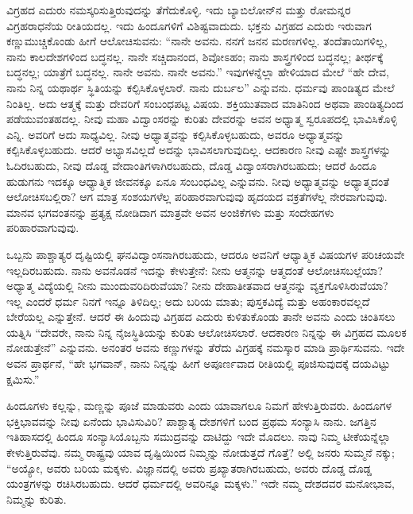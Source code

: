 ವಿಗ್ರಹದ ಎದುರು ನಮಸ್ಕರಿಸುತ್ತಿರುವುದನ್ನು ತೆಗೆದುಕೊಳ್ಳಿ. ಇದು ಬ್ಯಾಬಿಲೋನ್​ನ ಮತ್ತು ರೋಮನ್ನರ ವಿಗ್ರಹರಾಧನೆಯ ರೀತಿಯದಲ್ಲ. ಇದು ಹಿಂದೂಗಳಿಗೆ ವಿಶಿಷ್ಟವಾದುದು. ಭಕ್ತನು ವಿಗ್ರಹದ ಎದುರು ಇರುವಾಗ ಕಣ್ಣುಮುಚ್ಚಿಕೊಂಡು ಹೀಗೆ ಆಲೋಚಿಸುವನು: “ನಾನೇ ಅವನು. ನನಗೆ ಜನನ ಮರಣಗಳಿಲ್ಲ. ತಂದೆತಾಯಿಗಳಿಲ್ಲ, ನಾನು ಕಾಲದೇಶಗಳಿಂದ ಬದ್ಧನಲ್ಲ. ನಾನೇ ಸಚ್ಚಿದಾನಂದ, ಶಿವೋಽಹಂ; ನಾನು ಶಾಸ್ತ್ರಗಳಿಂದ ಬದ್ಧನಲ್ಲ; ತೀರ್ಥಕ್ಕೆ ಬದ್ಧನಲ್ಲ; ಯಾತ್ರೆಗೆ ಬದ್ಧನಲ್ಲ. ನಾನೇ ಅವನು. ನಾನೇ ಅವನು.” ಇವುಗಳನ್ನೆಲ್ಲಾ ಹೇಳಿಯಾದ ಮೇಲೆ “ಹೇ ದೇವ, ನಾನು ನಿನ್ನ ಯಥಾರ್ಥ ಸ್ಥಿತಿಯನ್ನು ಕಲ್ಪಿಸಿಕೊಳ್ಳಲಾರೆ. ನಾನು ದುರ್ಬಲ” ಎನ್ನುವನು. ಧರ್ಮವು ಪಾಂಡಿತ್ಯದ ಮೇಲೆ ನಿಂತಿಲ್ಲ. ಅದು ಆತ್ಮಕ್ಕೆ ಮತ್ತು ದೇವರಿಗೆ ಸಂಬಂಧಪಟ್ಟ ವಿಷಯ. ಶಕ್ತಿಯುತವಾದ ಮಾತಿನಿಂದ ಅಥವಾ ಪಾಂಡಿತ್ಯದಿಂದ ಪಡೆಯುವಂತಹದಲ್ಲ. ನೀವು ಮಹಾ ವಿದ್ವಾಂಸರನ್ನು ಕುರಿತು ದೇವರನ್ನು ಅವನ ಅಧ್ಯಾತ್ಮ ಸ್ವರೂಪದಲ್ಲಿ ಭಾವಿಸಿಕೊಳ್ಳಿ ಎನ್ನಿ. ಅವರಿಗೆ ಅದು ಸಾಧ್ಯವಿಲ್ಲ. ನೀವು ಅಧ್ಯಾತ್ಮವನ್ನು ಕಲ್ಪಿಸಿಕೊಳ್ಳಬಹುದು, ಅವರೂ ಅಧ್ಯಾತ್ಮವನ್ನು ಕಲ್ಪಿಸಿಕೊಳ್ಳಬಹುದು. ಆದರೆ ಅಭ್ಯಾಸವಿಲ್ಲದೆ ಅದನ್ನು ಭಾವಿಸಲಾಗುವುದಿಲ್ಲ. ಆದಕಾರಣ ನೀವು ಎಷ್ಟೇ ಶಾಸ್ತ್ರಗಳನ್ನು ಓದಿರಬಹುದು, ನೀವು ದೊಡ್ಡ ವೇದಾಂತಿಗಳಾಗಿರಬಹುದು, ದೊಡ್ಡ ವಿದ್ವಾಂಸರಾಗಿರಬಹುದು; ಆದರೆ ಹಿಂದೂ ಹುಡುಗನು ಇದಕ್ಕೂ ಆಧ್ಯಾತ್ಮಿಕ ಜೀವನಕ್ಕೂ ಏನೂ ಸಂಬಂಧವಿಲ್ಲ ಎನ್ನುವನು. ನೀವು ಅಧ್ಯಾತ್ಮವನ್ನು ಅಧ್ಯಾತ್ಮದಂತೆ ಆಲೋಚಿಸಬಲ್ಲಿರಾ? ಆಗ ಮಾತ್ರ ಸಂಶಯಗಳೆಲ್ಲ ಪರಿಹಾರವಾಗುವುವು ಹೃದಯದ ವಕ್ರತೆಗಳೆಲ್ಲ ನೇರವಾಗುವುವು. ಮಾನವ ಭಗವಂತನನ್ನು ಪ್ರತ್ಯಕ್ಷ ನೋಡಿದಾಗ ಮಾತ್ರವೇ ಅವನ ಅಂಜಿಕೆಗಳು ಮತ್ತು ಸಂದೇಹಗಳು ಪರಿಹಾರವಾಗುವುವು.

ಒಬ್ಬನು ಪಾಶ್ಚಾತ್ಯರ ದೃಷ್ಟಿಯಲ್ಲಿ ಘನವಿದ್ವಾಂಸನಾಗಿರಬಹುದು, ಆದರೂ ಅವನಿಗೆ ಆಧ್ಯಾತ್ಮಿಕ ವಿಷಯಗಳ ಪರಿಚಯವೇ ಇಲ್ಲದಿರಬಹುದು. ನಾನು ಅವನೊಡನೆ ಇದನ್ನು ಕೇಳುತ್ತೇನೆ: ನೀನು ಆತ್ಮನನ್ನು ಆತ್ಮದಂತೆ ಆಲೋಚಿಸಬಲ್ಲೆಯಾ? ಅಧ್ಯಾತ್ಮ ವಿದ್ಯೆಯಲ್ಲಿ ನೀನು ಮುಂದುವರಿದಿರುವೆಯಾ? ನೀನು ದೇಹಾತೀತವಾದ ಆತ್ಮನನ್ನು ವ್ಯಕ್ತಗೊಳಿಸಿರುವೆಯಾ? ಇಲ್ಲ ಎಂದರೆ ಧರ್ಮ ನಿನಗೆ ಇನ್ನೂ ತಿಳಿದಿಲ್ಲ; ಅದು ಬರಿಯ ಮಾತು; ಪುಸ್ತಕವಿದ್ಯೆ ಮತ್ತು ಅಹಂಕಾರವಲ್ಲದೆ ಬೇರೆಯಲ್ಲ ಎನ್ನುತ್ತೇನೆ. ಆದರೆ ಈ ಹಿಂದುವು ವಿಗ್ರಹದ ಎದುರು ಕುಳಿತುಕೊಂಡು ತಾನೇ ಅವನು ಎಂದು ಚಿಂತಿಸಲು ಯತ್ನಿಸಿ “ದೇವರೇ, ನಾನು ನಿನ್ನ ನೈಜಸ್ಥಿತಿಯನ್ನು ಕುರಿತು ಆಲೋಚಿಸಲಾರೆ. ಆದಕಾರಣ ನಿನ್ನನ್ನು ಈ ವಿಗ್ರಹದ ಮೂಲಕ ನೋಡುತ್ತೇನೆ” ಎನ್ನುವನು. ಅನಂತರ ಅವನು ಕಣ್ಣುಗಳನ್ನು ತೆರೆದು ವಿಗ್ರಹಕ್ಕೆ ನಮಸ್ಕಾರ ಮಾಡಿ ಪ್ರಾರ್ಥಿಸುವನು. ಇದೇ ಅವನ ಪ್ರಾರ್ಥನೆ, “ಹೇ ಭಗವಾನ್​, ನಾನು ನಿನ್ನನ್ನು ಹೀಗೆ ಅಪೂರ್ಣವಾದ ರೀತಿಯಲ್ಲಿ ಪೂಜಿಸುವುದಕ್ಕೆ ದಯವಿಟ್ಟು ಕ್ಷಮಿಸು.”

ಹಿಂದೂಗಳು ಕಲ್ಲನ್ನು, ಮಣ್ಣನ್ನು ಪೂಜೆ ಮಾಡುವರು ಎಂದು ಯಾವಾಗಲೂ ನಿಮಗೆ ಹೇಳುತ್ತಿರುವರು. ಹಿಂದೂಗಳ ಭಕ್ತಿಭಾವವನ್ನು ನೀವು ಏನೆಂದು ಭಾವಿಸುವಿರಿ? ಪಾಶ್ಚಾತ್ಯ ದೇಶಗಳಿಗೆ ಬಂದ ಪ್ರಥಮ ಸಂನ್ಯಾಸಿ ನಾನು. ಜಗತ್ತಿನ ಇತಿಹಾಸದಲ್ಲಿ ಹಿಂದೂ ಸಂನ್ಯಾಸಿಯೊಬ್ಬನು ಸಮುದ್ರವನ್ನು ದಾಟಿದ್ದು ಇದೇ ಮೊದಲು. ನಾವು ನಿಮ್ಮ ಟೀಕೆಯನ್ನೆಲ್ಲಾ ಕೇಳುತ್ತಿರುವೆವು. ನಮ್ಮ ರಾಷ್ಟ್ರವು ಯಾವ ದೃಷ್ಟಿಯಿಂದ ನಿಮ್ಮನ್ನು ನೋಡುತ್ತದೆ ಗೊತ್ತೆ? ಅಲ್ಲಿ ಜನರು ಸುಮ್ಮನೆ ನಕ್ಕು; “ಅಯ್ಯೋ, ಅವರು ಬರಿಯ ಮಕ್ಕಳು. ವಿಜ್ಞಾನದಲ್ಲಿ ಅವರು ಪ್ರಖ್ಯಾತರಾಗಿರಬಹುದು, ಅವರು ದೊಡ್ಡ ದೊಡ್ಡ ಯಂತ್ರಗಳನ್ನು ರಚಿಸಿರಬಹುದು. ಆದರೆ ಧರ್ಮದಲ್ಲಿ ಅವರಿನ್ನೂ ಮಕ್ಕಳು.” ಇದೇ ನಮ್ಮ ದೇಶದವರ ಮನೋಭಾವ, ನಿಮ್ಮನ್ನು ಕುರಿತು.


